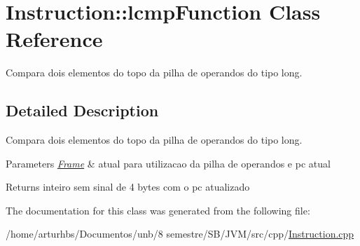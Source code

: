 \hypertarget{classInstruction_1_1lcmpFunction}{}\section{Instruction\+:\+:lcmp\+Function Class Reference}
\label{classInstruction_1_1lcmpFunction}


Compara dois elementos do topo da pilha de operandos do tipo long.  




\subsection{Detailed Description}
Compara dois elementos do topo da pilha de operandos do tipo long. 


\begin{DoxyParams}{Parameters}
{\em \hyperlink{classFrame}{Frame}} & atual para utilizacao da pilha de operandos e pc atual \\
\hline
\end{DoxyParams}
\begin{DoxyReturn}{Returns}
inteiro sem sinal de 4 bytes com o pc atualizado 
\end{DoxyReturn}


The documentation for this class was generated from the following file\+:\begin{DoxyCompactItemize}
\item 
/home/arturhbs/\+Documentos/unb/8 semestre/\+S\+B/\+J\+V\+M/src/cpp/\hyperlink{Instruction_8cpp}{Instruction.\+cpp}\end{DoxyCompactItemize}
